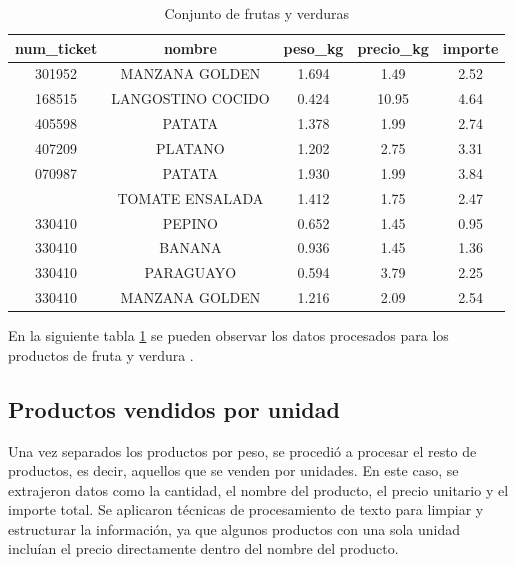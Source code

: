 \documentclass[,article,submit,moreauthors,pdftex]{Definitions/mdpi}
\begin{document}
\begin{table}

\caption{\label{tab:tabla_fruta_verdura}Conjunto de frutas y verduras}
\centering
\begin{tabular}[t]{ccccc}
\toprule
num\_ticket & nombre & peso\_kg & precio\_kg & importe\\
\midrule
301952 & MANZANA GOLDEN & 1.694 & 1.49 & 2.52\\
168515 & LANGOSTINO COCIDO & 0.424 & 10.95 & 4.64\\
405598 & PATATA & 1.378 & 1.99 & 2.74\\
407209 & PLATANO & 1.202 & 2.75 & 3.31\\
070987 & PATATA & 1.930 & 1.99 & 3.84\\
\addlinespace
070987 & TOMATE ENSALADA & 1.412 & 1.75 & 2.47\\
330410 & PEPINO & 0.652 & 1.45 & 0.95\\
330410 & BANANA & 0.936 & 1.45 & 1.36\\
330410 & PARAGUAYO & 0.594 & 3.79 & 2.25\\
330410 & MANZANA GOLDEN & 1.216 & 2.09 & 2.54\\
\bottomrule
\end{tabular}
\end{table}

En la siguiente tabla \ref{tab:tabla_fruta_verdura} se pueden observar
los datos procesados para los productos de fruta y verdura .

\hypertarget{productos-vendidos-por-unidad}{%
\subsection{Productos vendidos por
unidad}\label{productos-vendidos-por-unidad}}

Una vez separados los productos por peso, se procedió a procesar el
resto de productos, es decir, aquellos que se venden por unidades. En
este caso, se extrajeron datos como la cantidad, el nombre del producto,
el precio unitario y el importe total. Se aplicaron técnicas de
procesamiento de texto para limpiar y estructurar la información, ya que
algunos productos con una sola unidad incluían el precio directamente
dentro del nombre del producto.
\end{document}
